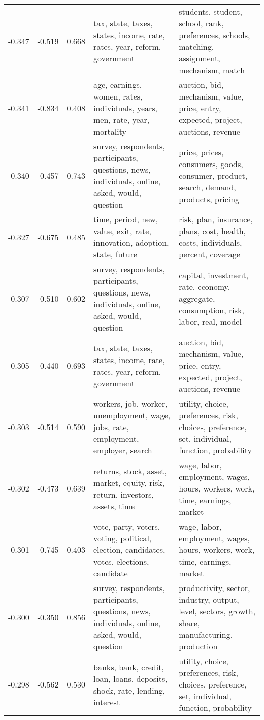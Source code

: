 \begin{tabular}{cccp{5cm}p{5cm}}
-0.347 & -0.519 & 0.668 & tax, state, taxes, states, income, rate, rates, year, reform, government & students, student, school, rank, preferences, schools, matching, assignment, mechanism, match \\
-0.341 & -0.834 & 0.408 & age, earnings, women, rates, individuals, years, men, rate, year, mortality & auction, bid, mechanism, value, price, entry, expected, project, auctions, revenue \\
-0.340 & -0.457 & 0.743 & survey, respondents, participants, questions, news, individuals, online, asked, would, question & price, prices, consumers, goods, consumer, product, search, demand, products, pricing \\
-0.327 & -0.675 & 0.485 & time, period, new, value, exit, rate, innovation, adoption, state, future & risk, plan, insurance, plans, cost, health, costs, individuals, percent, coverage \\
-0.307 & -0.510 & 0.602 & survey, respondents, participants, questions, news, individuals, online, asked, would, question & capital, investment, rate, economy, aggregate, consumption, risk, labor, real, model \\
-0.305 & -0.440 & 0.693 & tax, state, taxes, states, income, rate, rates, year, reform, government & auction, bid, mechanism, value, price, entry, expected, project, auctions, revenue \\
-0.303 & -0.514 & 0.590 & workers, job, worker, unemployment, wage, jobs, rate, employment, employer, search & utility, choice, preferences, risk, choices, preference, set, individual, function, probability \\
-0.302 & -0.473 & 0.639 & returns, stock, asset, market, equity, risk, return, investors, assets, time & wage, labor, employment, wages, hours, workers, work, time, earnings, market \\
-0.301 & -0.745 & 0.403 & vote, party, voters, voting, political, election, candidates, votes, elections, candidate & wage, labor, employment, wages, hours, workers, work, time, earnings, market \\
-0.300 & -0.350 & 0.856 & survey, respondents, participants, questions, news, individuals, online, asked, would, question & productivity, sector, industry, output, level, sectors, growth, share, manufacturing, production \\
-0.298 & -0.562 & 0.530 & banks, bank, credit, loan, loans, deposits, shock, rate, lending, interest & utility, choice, preferences, risk, choices, preference, set, individual, function, probability \\

\end{tabular}
